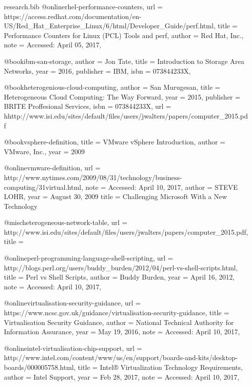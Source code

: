 \documentclass{article}
\begin{document}
\begin{filecontents*}{research.bib}
    @online{rhel-performance-counters,
        url = {https://access.redhat.com/documentation/en-US/Red_Hat_Enterprise_Linux/6/html/Developer_Guide/perf.html},
        title = {Performance Counters for Linux (PCL) Tools and perf},
        author = {Red Hat, Inc.},
        note = {Accessed: April 05, 2017},
    }

    @book{ibm-san-storage,
        author    = {Jon Tate},
        title     = {Introduction to Storage Area Networks},
        year      = {2016},
        publisher = {IBM},
        isbn      =  {073844233X},
    }

    @book{heterogenious-cloud-computing,
        author    = {San Murugesan},
        title     = {Heterogeneous Cloud Computing: The Way Forward},
        year      = {2015},
        publisher = {BRITE Proffesional Services},
        isbn      =  {073844233X},
        url = {hhttp://www.isi.edu/sites/default/files/users/jwalters/papers/computer_2015.pdf}
    }

    @book{vsphere-definition,
        title = {VMware vSphere Introduction},
        author = {VMware, Inc.},
        year = {2009}
    }

    @online{vmware-definition,
        url = {http://www.nytimes.com/2009/08/31/technology/business-computing/31virtual.html},
        note = {Accessed: April 10, 2017},
        author = {STEVE LOHR},
        year = {August 30, 2009}
        title = {Challenging Microsoft With a New Technology}
    }

    @misc{heterogeneous-network-table,
        url = {http://www.isi.edu/sites/default/files/users/jwalters/papers/computer_2015.pdf},
        title = {}
    }

    @online{perl-programming-language-shell-scripting,
        url = {http://blogs.perl.org/users/buddy_burden/2012/04/perl-vs-shell-scripts.html},
        title = {Perl vs Shell Scripts},
        author = {Buddy Burden},
        year = {April 16, 2012},
        note = {Accessed: April 10, 2017},
    }

	@online{virtualisation-security-guidance,
	    url = {https://www.ncsc.gov.uk/guidance/virtualisation-security-guidance},
		title = {Virtualisation Security Guidance},
		author = {National Technical Authority for Information Assurance},
		year = {May 19, 2016},
		note = {Accessed: April 10, 2017},
	}

	@online{intel-virtualisation-chip-support,
		url = {http://www.intel.com/content/www/us/en/support/boards-and-kits/desktop-boards/000005758.html},
		title = { Intel® Virtualization Technology Requirements},
		author = {Intel Support},
		year = {Feb 28, 2017},
		note = {Accessed: April 10, 2017},
	}


\end{filecontents*}
\end{document}
